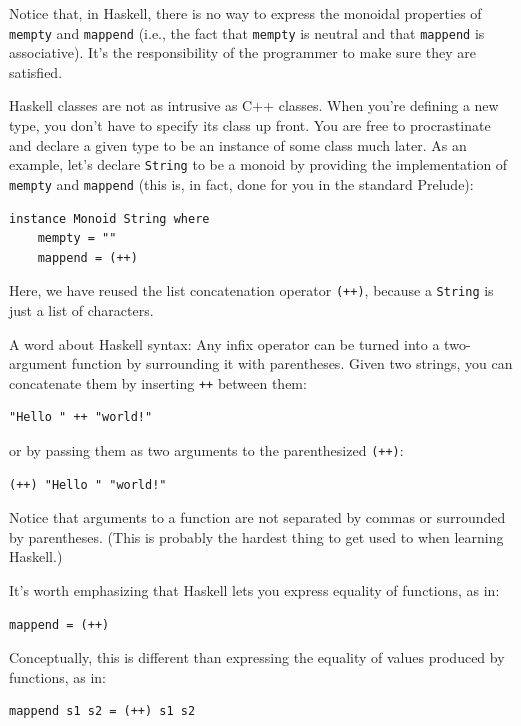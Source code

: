 Notice that, in Haskell, there is no way to express the monoidal
properties of \texttt{mempty} and \texttt{mappend} (i.e., the fact that
\texttt{mempty} is neutral and that \texttt{mappend} is associative).
It's the responsibility of the programmer to make sure they are
satisfied.

Haskell classes are not as intrusive as C++ classes. When you're
defining a new type, you don't have to specify its class up front. You
are free to procrastinate and declare a given type to be an instance of
some class much later. As an example, let's declare \texttt{String} to
be a monoid by providing the implementation of \texttt{mempty} and
\texttt{mappend} (this is, in fact, done for you in the standard
Prelude):

\begin{verbatim}
instance Monoid String where
    mempty = ""
    mappend = (++)
\end{verbatim}

Here, we have reused the list concatenation operator \texttt{(++)},
because a \texttt{String} is just a list of characters.

A word about Haskell syntax: Any infix operator can be turned into a
two-argument function by surrounding it with parentheses. Given two
strings, you can concatenate them by inserting \texttt{++} between them:

\begin{verbatim}
"Hello " ++ "world!"
\end{verbatim}

or by passing them as two arguments to the parenthesized \texttt{(++)}:

\begin{verbatim}
(++) "Hello " "world!"
\end{verbatim}

Notice that arguments to a function are not separated by commas or
surrounded by parentheses. (This is probably the hardest thing to get
used to when learning Haskell.)

It's worth emphasizing that Haskell lets you express equality of
functions, as in:

\begin{verbatim}
mappend = (++)
\end{verbatim}

Conceptually, this is different than expressing the equality of values
produced by functions, as in:

\begin{verbatim}
mappend s1 s2 = (++) s1 s2
\end{verbatim}

